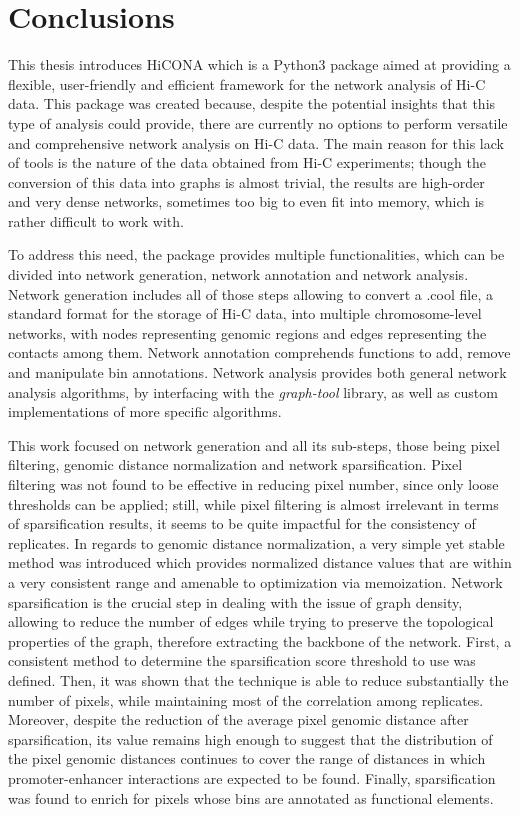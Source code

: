\graphicspath{{chapters/07_conclusions/}}
\chapter{Conclusions}

This thesis introduces HiCONA which is a Python3 package aimed at providing a flexible, user-friendly and efficient framework for the network analysis of Hi-C data. This package was created because, despite the potential insights that this type of analysis could provide, there are currently no options to perform versatile and comprehensive network analysis on Hi-C data. The main reason for this lack of tools is the nature of the data obtained from Hi-C experiments; though the conversion of this data into graphs is almost trivial, the results are high-order and very dense networks, sometimes too big to even fit into memory, which is rather difficult to work with.

To address this need, the package provides multiple functionalities, which can be divided into network generation, network annotation and network analysis. Network generation includes all of those steps allowing to convert a .cool file, a standard format for the storage of Hi-C data, into multiple chromosome-level networks, with nodes representing genomic regions and edges representing the contacts among them. Network annotation comprehends functions to add, remove and manipulate bin annotations. Network analysis provides both general network analysis algorithms, by interfacing with the \textit{graph-tool} library, as well as custom implementations of more specific algorithms. 

This work focused on network generation and all its sub-steps, those being pixel filtering, genomic distance normalization and network sparsification. Pixel filtering was not found to be effective in reducing pixel number, since only loose thresholds can be applied; still, while pixel filtering is almost irrelevant in terms of sparsification results, it seems to be quite impactful for the consistency of replicates. In regards to genomic distance normalization, a very simple yet stable method was introduced which provides normalized distance values that are within a very consistent range and amenable to optimization via memoization. Network sparsification is the crucial step in dealing with the issue of graph density, allowing to reduce the number of edges while trying to preserve the topological properties of the graph, therefore extracting the backbone of the network. First, a consistent method to determine the sparsification score threshold to use was defined. Then, it was shown that the technique is able to reduce substantially the number of pixels, while maintaining most of the correlation among replicates. Moreover, despite the reduction of the average pixel genomic distance after sparsification, its value remains high enough to suggest that the distribution of the pixel genomic distances continues to cover the range of distances in which promoter-enhancer interactions are expected to be found. Finally, sparsification was found to enrich for pixels whose bins are annotated as functional elements.

